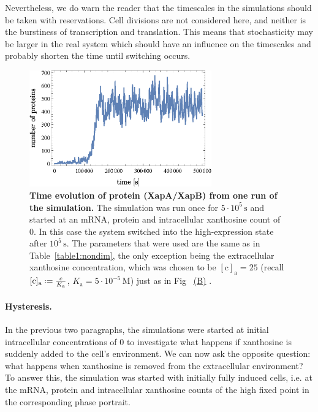 \documentclass[10pt,letterpaper]{article}
\newcommand{\unit}[1]{\,\mathrm{#1}}
\newcommand{\n}[1]{\mathrm{#1}}
\newcommand*{\defeq}{\mathrel{\vcenter{\baselineskip0.5ex \lineskiplimit0pt
			\hbox{\scriptsize.}\hbox{\scriptsize.}}}%
	=}
\newcommand\subref[2]{%
	\def\myref{\getrefnumber{#1}}%
	\hyperref[#1]{\myref\mbox{#2}}%
}
\begin{document}
Nevertheless, we do warn the reader that the timescales in the simulations
should be taken with reservations. Cell divisions are not considered here,
and neither is the burstiness of transcription and translation. This means
that stochasticity may be larger in the real system which should have an
influence on the timescales and probably shorten the time until switching
occurs.

\begin{figure}%
	\centering
	\includegraphics[width=0.7\textwidth]{media/TimeEvolution.eps}
	\caption{{\bf Time evolution of protein (XapA/XapB) from one run of the simulation.}
		The simulation was run once for $5 \cdot 10^5 \unit{s}$ and started
		at an mRNA, protein and intracellular xanthosine count of 0. In this
		case the system switched into the high-expression state after $10^5
		\unit{s}$. The parameters that were used are the same as in
		Table~\ref{table1:nondim}, the only exception being the
		extracellular xanthosine concentration, which was chosen to be
		$\n{[c]_a} = 25$ (recall $\n{[c]_{a}} \defeq \frac{c}{K_{\n{a}}}$,
		$K_{\n{a}} = 5 \cdot 10^{-5} \unit{M}$) just as in
		Fig~\subref{fig8:stochC}{(B)}.}
	\label{fig:StochT}
\end{figure}

\paragraph*{Hysteresis.} 
In the previous two paragraphs, the simulations were started at initial
intracellular concentrations of 0 to investigate what happens if xanthosine
is suddenly added to the cell's environment. We can now ask the opposite
question: what happens when xanthosine is removed from the extracellular
environment? To answer this, the simulation was started with initially fully
induced cells, i.e. at the mRNA, protein and intracellular xanthosine counts
of the high fixed point in the corresponding phase portrait. 
\end{document}
